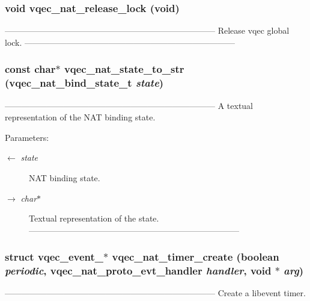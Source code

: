 \subsubsection{\setlength{\rightskip}{0pt plus 5cm}void vqec\_\-nat\_\-release\_\-lock (void)}\label{vqec__nat__api_8c_71744177776635f97d65302664112ce0}


--------------------------------------------------------------------------- Release vqec global lock. --------------------------------------------------------------------------- 
\subsubsection{\setlength{\rightskip}{0pt plus 5cm}const char$\ast$ vqec\_\-nat\_\-state\_\-to\_\-str (vqec\_\-nat\_\-bind\_\-state\_\-t {\em state})}\label{vqec__nat__api_8c_987450462ffbfe9f9f474c9ca74f97de}


--------------------------------------------------------------------------- A textual representation of the NAT binding state.

\begin{Desc}
\item[Parameters:]
\begin{description}
\item[\mbox{$\leftarrow$} {\em state}]NAT binding state. \item[\mbox{$\rightarrow$} {\em char$\ast$}]Textual representation of the state. --------------------------------------------------------------------------- \end{description}
\end{Desc}
\subsubsection{\setlength{\rightskip}{0pt plus 5cm}struct vqec\_\-event\_\-$\ast$ vqec\_\-nat\_\-timer\_\-create (boolean {\em periodic}, vqec\_\-nat\_\-proto\_\-evt\_\-handler {\em handler}, void $\ast$ {\em arg})}\label{vqec__nat__api_8c_3b08c8c3f11dbc4b1cc88d0697ad2a1c}


--------------------------------------------------------------------------- Create a libevent timer.


